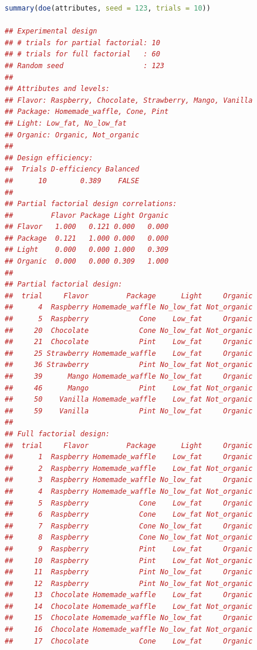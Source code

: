 \documentclass{article}
\begin{document}
\begin{lstlisting}[language=R]
summary(doe(attributes, seed = 123, trials = 10))

## Experimental design
## # trials for partial factorial: 10 
## # trials for full factorial   : 60 
## Random seed                   : 123 
## 
## Attributes and levels:
## Flavor: Raspberry, Chocolate, Strawberry, Mango, Vanilla 
## Package: Homemade_waffle, Cone, Pint 
## Light: Low_fat, No_low_fat 
## Organic: Organic, Not_organic 
## 
## Design efficiency:
##  Trials D-efficiency Balanced
##      10        0.389    FALSE
## 
## Partial factorial design correlations:
##         Flavor Package Light Organic
## Flavor   1.000   0.121 0.000   0.000
## Package  0.121   1.000 0.000   0.000
## Light    0.000   0.000 1.000   0.309
## Organic  0.000   0.000 0.309   1.000
## 
## Partial factorial design:
##  trial     Flavor         Package      Light     Organic
##      4  Raspberry Homemade_waffle No_low_fat Not_organic
##      5  Raspberry            Cone    Low_fat     Organic
##     20  Chocolate            Cone No_low_fat Not_organic
##     21  Chocolate            Pint    Low_fat     Organic
##     25 Strawberry Homemade_waffle    Low_fat     Organic
##     36 Strawberry            Pint No_low_fat Not_organic
##     39      Mango Homemade_waffle No_low_fat     Organic
##     46      Mango            Pint    Low_fat Not_organic
##     50    Vanilla Homemade_waffle    Low_fat Not_organic
##     59    Vanilla            Pint No_low_fat     Organic
## 
## Full factorial design:
##  trial     Flavor         Package      Light     Organic
##      1  Raspberry Homemade_waffle    Low_fat     Organic
##      2  Raspberry Homemade_waffle    Low_fat Not_organic
##      3  Raspberry Homemade_waffle No_low_fat     Organic
##      4  Raspberry Homemade_waffle No_low_fat Not_organic
##      5  Raspberry            Cone    Low_fat     Organic
##      6  Raspberry            Cone    Low_fat Not_organic
##      7  Raspberry            Cone No_low_fat     Organic
##      8  Raspberry            Cone No_low_fat Not_organic
##      9  Raspberry            Pint    Low_fat     Organic
##     10  Raspberry            Pint    Low_fat Not_organic
##     11  Raspberry            Pint No_low_fat     Organic
##     12  Raspberry            Pint No_low_fat Not_organic
##     13  Chocolate Homemade_waffle    Low_fat     Organic
##     14  Chocolate Homemade_waffle    Low_fat Not_organic
##     15  Chocolate Homemade_waffle No_low_fat     Organic
##     16  Chocolate Homemade_waffle No_low_fat Not_organic
##     17  Chocolate            Cone    Low_fat     Organic

\end{lstlisting}
\end{document}
